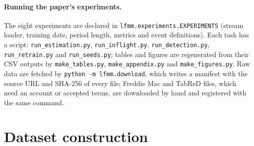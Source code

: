 \documentclass[11pt]{article}
\begin{document}


{\sloppy
\paragraph{Running the paper's experiments.} The eight experiments are declared in
\texttt{lfmm.experiments.EXPERIMENTS} (stream loader, training date, period length, metrics and
event definitions). Each task has a script: \texttt{run\_estimation.py}, \texttt{run\_inflight.py},
\texttt{run\_detection.py}, \texttt{run\_retrain.py} and \texttt{run\_seeds.py}; tables and figures
are regenerated from their CSV outputs by \texttt{make\_tables.py}, \texttt{make\_appendix.py} and
\texttt{make\_figures.py}. Raw data are fetched by \texttt{python -m lfmm.download}, which writes a
manifest with the source URL and SHA-256 of every file; Freddie Mac and TabReD files, which need an
account or accepted terms, are downloaded by hand and registered with the same command.\par}

\section{Dataset construction}\label{app:data}

\begin{table}[h]
\centering
\caption{Streams after construction. Rows are those used in the experiments (ACS and BRFSS are
sampled per year from the full tables; NYC taxi keeps 50k card trips per month).}
\label{tab:data}
\scriptsize
{}
\end{table}
\end{document}

